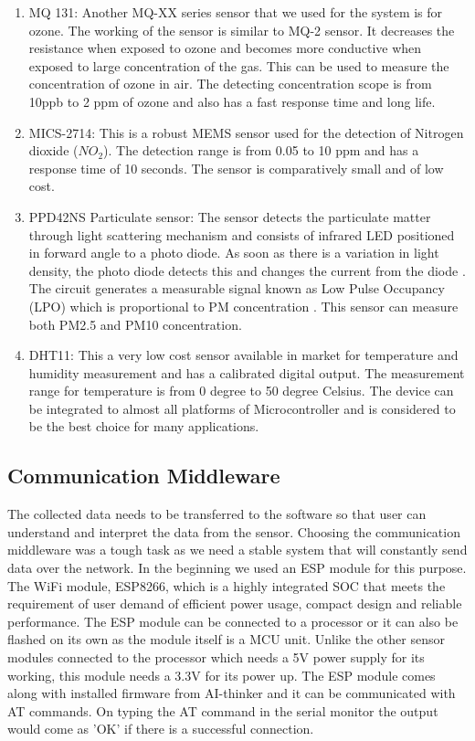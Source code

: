 \begin{enumerate}
\item MQ 131: Another MQ-XX series sensor that we used for the system is for ozone. The working of the sensor is similar to MQ-2 sensor. It decreases the resistance when exposed to ozone and becomes more conductive when exposed to large concentration of the gas. This can be used to measure the concentration of ozone in air. The detecting concentration scope is from 10ppb to 2 ppm of ozone and also has a fast response time and long life.

\item MICS-2714: This is a robust MEMS sensor used for the detection of Nitrogen dioxide ($NO_2$). The detection range is from 0.05 to 10 ppm and has a response time of 10 seconds. The sensor is comparatively small and of low cost.

\item  PPD42NS Particulate sensor: The sensor detects the particulate matter through light scattering mechanism and consists of infrared LED positioned in forward angle to a photo diode. As soon as there is a variation in light density, the photo diode detects this and changes the current from the diode \cite{Allen2002}. The circuit generates a measurable signal known as Low Pulse Occupancy (LPO) which is proportional to PM concentration \cite{Kuula2017}. This sensor can measure both PM2.5 and PM10 concentration.

\item DHT11: This a very low cost sensor available in market for temperature and humidity measurement and has a calibrated digital output. The measurement range for temperature is from 0 degree to 50 degree Celsius. The device can be integrated to almost all platforms of Microcontroller and is considered to be the best choice for many applications.

 \end{enumerate}

 \subsection{Communication Middleware}
 
 The collected data needs to be transferred to the software so that user can understand and interpret the data from the sensor. Choosing the communication middleware was a tough task as we need a stable system that will constantly send data over the network. In the beginning we used an ESP module for this purpose. The WiFi module, ESP8266, which is a highly integrated SOC that meets the requirement of user demand of efficient power usage, compact design and reliable performance\cite{Systems2018}. The ESP module can be connected to a processor or it can also be flashed on its own as the module itself is a MCU unit. Unlike the other sensor modules connected to the processor which needs a 5V power supply for its working, this module needs a 3.3V for its power up. The ESP module comes along with installed firmware from AI-thinker and it can be communicated with AT commands. On typing the AT command in the serial monitor the output would come as 'OK' if there is a successful connection. 

